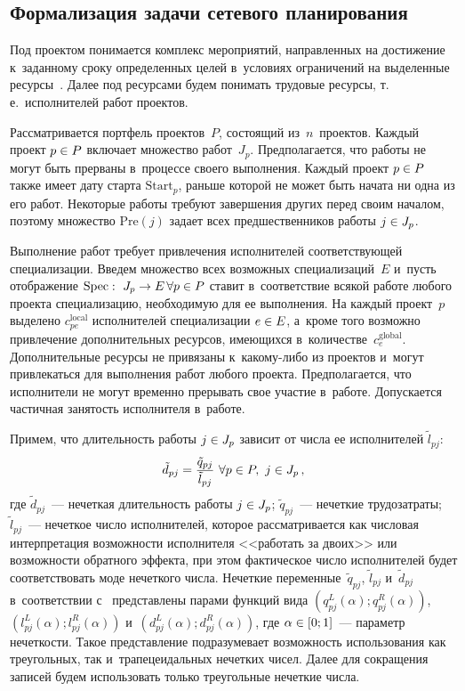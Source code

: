 \begin{multicols}{2}
\section{Формализация задачи сетевого планирования}
  
  Под проектом понимается комплекс мероприятий, направленных на 
достижение к~заданному сроку определенных целей в~условиях ограничений на 
выделенные ресурсы~\cite{6-zac}. Далее под ресурсами будем понимать 
трудовые ресурсы, т.\,е.\ исполнителей работ проектов.
  
  Рассматривается портфель проектов~$P$, со\-сто\-ящий из~$n$~проектов. 
Каждый проект $p\hm\in P$ включает множество работ~$J_p$. Предполагается, 
что работы не могут быть прерваны в~процессе своего выполнения. Каждый 
проект $p\hm\in P$ также имеет дату старта $\mathrm{Start}_p$, раньше которой не может 
быть начата ни одна из его работ. Некоторые работы требуют завершения 
других перед своим началом, поэтому множество $\mathrm{Pre}(j)$ задает всех 
предшественников работы $j\hm\in J_p$.
  
  Выполнение работ требует привлечения исполнителей соответствующей 
специализации. Введем множество всех возможных специализаций~$E$ 
и~пусть отображение $\mathrm{Spec}:\ J_p\hm\to E \,\forall p\hm\in P$ ставит 
в~соответствие всякой работе любого проекта специализацию, необходимую 
для ее выполнения. На каждый проект~$p$ выделено $c_{pe}^{\mathrm{local}}$ 
исполнителей специализации $e\hm\in E$, а~кроме того возможно привлечение 
дополнительных ресурсов, имеющихся в~количестве~$c_e^{\mathrm{global}}$. 
Дополнительные ресурсы не привязаны к~ка\-ко\-му-ли\-бо из проектов и~могут 
привлекаться для выполнения работ любого проекта. Предполагается, что 
исполнители не могут временно прерывать свое участие в~работе. Допускается 
частичная занятость исполнителя в~работе. 
  
  Примем, что длительность работы $j\hm\in J_p$ зависит от числа ее 
исполнителей $\tilde{l}_{pj}$:
  \begin{equation*}
  \tilde{d}_{pj}=\displaystyle\frac{\displaystyle \tilde{q}_{pj}\mathstrut}{\displaystyle \tilde{l}_{pj}\mathstrut}\ \forall p\in P,\ j\in J_p\,,
  \end{equation*}
где $\tilde{d}_{pj}$~--- нечеткая длительность работы $j\hm\in J_p$; 
$\tilde{q}_{pj}$~--- нечеткие трудозатраты; $\tilde{l}_{pj}$~--- нечеткое число 
исполнителей, которое рассматривается как числовая интерпретация 
возможности исполнителя <<работать за двоих>> или возможности обратного 
эффекта, при этом фактическое число исполнителей будет соответствовать 
моде нечеткого числа. Нечеткие переменные~$\tilde{q}_{pj}$, $\tilde{l}_{pj}$ 
и~$\tilde{d}_{pj}$ в~соответствии с~\cite{9-zac} представлены парами функций 
вида $(q^L_{pj}(\alpha); q^R_{pj}(\alpha))$, $(l^L_{pj}(\alpha); l^R_{pj}(\alpha))$ 
и~$(d^L_{pj}(\alpha); d^R_{pj}(\alpha))$, где $\alpha\hm\in [0;1]$~--- параметр 
нечеткости. Такое пред\-став\-ле\-ние под\-разуме\-ва\-ет возможность использования 
как треугольных, так и~трапецеидальных нечетких чисел. Далее для сокращения 
записей будем использовать только треугольные нечеткие числа.
  

\end{multicols}
